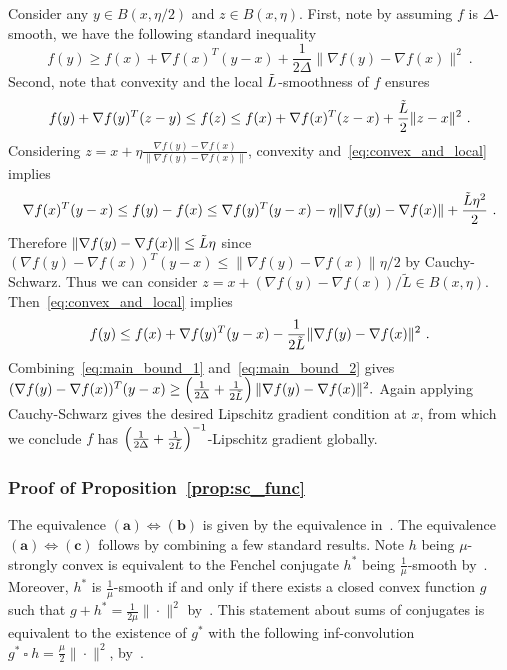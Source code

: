 \documentclass[sn-mathphys,Numbered]{sn-jnl}%
\begin{document}
\begin{appendices}
{Consider any $y\in B(x, \eta/2)$ and $z\in B(x, \eta)$.
First, note by assuming $f$ is $\Delta$-smooth, we have the following standard inequality
\begin{equation} \label{eq:main_bound_1}
f(y) \geq f(x)+\nabla f(x)^T(y-x)+\frac{1}{2\Delta}\|\nabla f(y)-\nabla f(x)\|^2 \ .
\end{equation}
Second, note that convexity and the local $\Tilde{L}$-smoothness of $f$ ensures
\begin{equation}
f(y)+\nabla f(y)^T(z-y) \leq f(z) \leq f(x)+\nabla f(x)^T(z-x)+\frac{\Tilde{L}}{2}\|z-x\|^2 \ .  \label{eq:convex_and_local}
\end{equation}
Considering $z=x+\eta \frac{\nabla f(y)-\nabla f(x)}{\|\nabla f(y)-\nabla f(x)\|}$, convexity and~\eqref{eq:convex_and_local} implies
$$ \nabla f(x)^T(y-x) \leq f(y) -f(x) \leq \nabla f(y)^T(y-x) -\eta\|\nabla f(y)-\nabla f(x)\| +\frac{\Tilde{L}\eta^2}{2}\ . $$
Therefore $\|\nabla f(y)-\nabla f(x)\| \leq \Tilde{L}\eta$ since $(\nabla f(y)-\nabla f(x))^T(y-x) \leq \|\nabla f(y)-\nabla f(x)\| \eta/2$ by Cauchy-Schwarz. Thus we can consider $z=x+(\nabla f(y)-\nabla f(x))/\tilde{L} \in B(x,\eta)$. Then~\eqref{eq:convex_and_local} implies
\begin{equation} \label{eq:main_bound_2}
    f(y) \leq f(x) +\nabla f(y)^T(y-x) -\frac{1}{2\Tilde{L}}\|\nabla f(y)-\nabla f(x)\|^2 \ . 
\end{equation}
Combining~\eqref{eq:main_bound_1} and~\eqref{eq:main_bound_2} gives 
$(\nabla f(y)-\nabla f(x))^T(y-x)\geq \left(\frac{1}{2\Delta}+\frac{1}{2\Tilde{L}}\right)\|\nabla f(y)-\nabla f(x)\|^2 . $
Again applying Cauchy-Schwarz gives the desired Lipschitz gradient condition at $x$, from which we conclude $f$ has $\left(\frac{1}{2\Delta}+\frac{1}{2\Tilde{L}}\right)^{-1}$-Lipschitz gradient globally.


\subsubsection{Proof of Proposition~\ref{prop:sc_func}} \label{proof:sc_func}
The equivalence $\mathbf{(a)\Leftrightarrow(b)}$ is given by the equivalence in~\cite[Theorem 5.24 $\mathbf{(ii) \Leftrightarrow (iii)}$]{beck2017first}.
The equivalence $\mathbf{(a)\Leftrightarrow(c)}$ follows by combining a few standard results. Note $h$ being $\mu$-strongly convex is equivalent to the Fenchel conjugate $h^*$ being $\frac{1}{\mu}$-smooth by~\cite[Theorem 12.60 $\mathbf{(a)\Leftrightarrow(b)}$]{rockafellar2009variational}. Moreover, $h^*$ is $\frac{1}{\mu}$-smooth if and only if there exists a closed convex function $g$ such that $g+h^*=\frac{1}{2\mu}\|\cdot\|^2$ by~\cite[Lemma 4 $\mathbf{[1]\Leftrightarrow[2]}$]{zhou2018fenchel}. This statement about sums of conjugates is equivalent to the existence of $g^*$ with the following inf-convolution $g^*\ \square \ h=\frac{\mu}{2}\|\cdot\|^2$, by~\cite[Theorem 11.23(a)]{rockafellar2009variational}.


}
\end{appendices}
\end{document}
